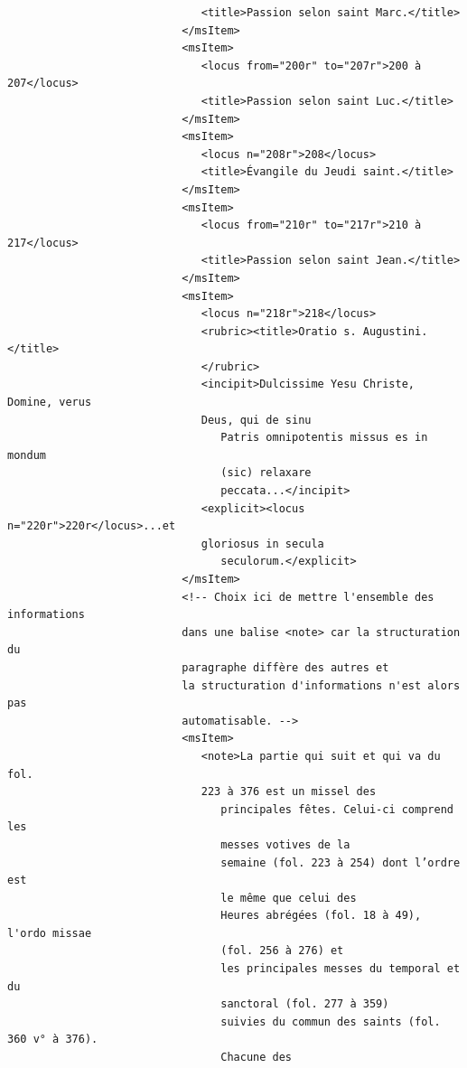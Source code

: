 \documentclass[a4paper,12pt,twoside]{book}
\begin{document}
\begin{verbatim}
                              <title>Passion selon saint Marc.</title>
                           </msItem>
                           <msItem>
                              <locus from="200r" to="207r">200 à 207</locus>
                              <title>Passion selon saint Luc.</title>
                           </msItem>
                           <msItem>
                              <locus n="208r">208</locus>
                              <title>Évangile du Jeudi saint.</title>
                           </msItem>
                           <msItem>
                              <locus from="210r" to="217r">210 à 217</locus>
                              <title>Passion selon saint Jean.</title>
                           </msItem>
                           <msItem>
                              <locus n="218r">218</locus>
                              <rubric><title>Oratio s. Augustini.</title>
                              </rubric>
                              <incipit>Dulcissime Yesu Christe, Domine, verus 
                              Deus, qui de sinu
                                 Patris omnipotentis missus es in mondum 
                                 (sic) relaxare
                                 peccata...</incipit>
                              <explicit><locus n="220r">220r</locus>...et 
                              gloriosus in secula
                                 seculorum.</explicit>
                           </msItem>
                           <!-- Choix ici de mettre l'ensemble des informations
                           dans une balise <note> car la structuration du 
                           paragraphe diffère des autres et
                           la structuration d'informations n'est alors pas 
                           automatisable. -->
                           <msItem>
                              <note>La partie qui suit et qui va du fol. 
                              223 à 376 est un missel des
                                 principales fêtes. Celui-ci comprend les 
                                 messes votives de la
                                 semaine (fol. 223 à 254) dont l’ordre est 
                                 le même que celui des
                                 Heures abrégées (fol. 18 à 49), l'ordo missae
                                 (fol. 256 à 276) et
                                 les principales messes du temporal et du 
                                 sanctoral (fol. 277 à 359)
                                 suivies du commun des saints (fol. 360 v° à 376).
                                 Chacune des

\end{verbatim}
\end{document}
